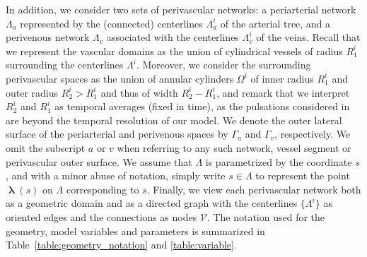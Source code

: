 \documentclass[fleqn,10pt]{wlscirep}
\begin{document}
In addition, we consider two sets of perivascular networks: a
periarterial network $\Lambda_a$ represented by the (connected)
centerlines $\Lambda^i_{a}$ of the arterial tree, and a perivenous
network $\Lambda_v$ associated with the centerlines $\Lambda^i_{v}$ of
the veins. Recall that we represent the vascular domains as the union
of cylindrical vessels of radius $R_1^i$ surrounding the centerlines
$\Lambda^i$. Moreover, we consider the surrounding perivascular spaces
as the union of annular cylinders $\Omega^i$ of inner radius $R_1^i$
and outer radius $R_2^i > R_1^i$ and thus of width $R_2^i - R_1^i$,
and remark that we interpret $R^i_2$ and $R^i_1$ as temporal averages
(fixed in time), as the pulsations considered in
 are beyond the temporal resolution of our
model. We denote the outer lateral surface of the periarterial and
perivenous spaces by $\Gamma_a$ and $\Gamma_v$, respectively. We omit
the subscript $a$ or $v$ when referring to any such network, vessel
segment or perivascular outer surface. We assume that $\Lambda$ is
parametrized by the coordinate $s$, and with a minor abuse of
notation, simply write $s \in \Lambda$ to represent the point ${\boldsymbol{\uplambda}}(s)$ on $\Lambda$ corresponding to $s$. Finally, we view
each perivascular network both as a geometric domain and as a directed
graph with the centerlines $\{ \Lambda^i \}$ as oriented edges and the
connections as nodes $\mathcal{V}$. The notation used for the
geometry, model variables and parameters is summarized in
Table~\ref{table:geometry_notation} and \ref{table:variable}.
\end{document}
